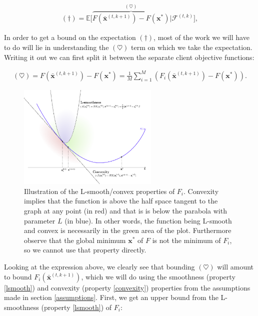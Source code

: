\begin{align}
    (\dagger) = \mathbb{E} \Big[ \overbrace{F(\bar{\bm{x}}^{(t,k+1)}) - F(\bm{x}^*)}^{(\heartsuit)} | \mathcal{F}^{(t,k)}\Big],
    \label{eq:expected_sub_progress}
\end{align}

In order to get a bound on the expectation $(\dagger)$, most of the work we will have to do will lie in understanding the $(\heartsuit)$ term on which we take the expectation. Writing it out we can first split it between the separate client objective functions:

\begin{align}
    (\heartsuit) = F(\bar{\bm{x}}^{(t,k+1)}) - F(\bm{x}^*) = \frac{1}{M} \sum_{i=1}^M \left( F_i(\bar{\bm{x}}^{(t,k+1)})  - F(\bm{x}^*)\right).
    \label{eq:sub_progress}
\end{align}

\begin{figure}[h!]
    \centering
    \includegraphics[width=0.6\textwidth]{figures/smooth_convex.pdf}
    \caption{Illustration of the L-smooth/convex properties of $F_i$. Convexity implies that the function is above the half space tangent to the graph at any point (in red) and that is is below the parabola with parameter $L$ (in blue). In other words, the function being L-smooth and convex is necessarily in the green area of the plot. Furthermore observe that the global minimum $\bm{x}^*$ of $F$ is not the minimum of $F_i$, so we cannot use that property directly.}
\end{figure}

Looking at the expression above, we clearly see that bounding $(\heartsuit)$ will amount to bound $F_i(\bar{\bm{x}}^{(t,k+1)})$, which we will do using the smoothness (property \ref{lsmooth}) and convexity (property \ref{convexity}) properties from the assumptions made in section \ref{assumptions}. First, we get an upper bound from the L-smoothness (property \ref{lsmooth}) of $F_i$:

